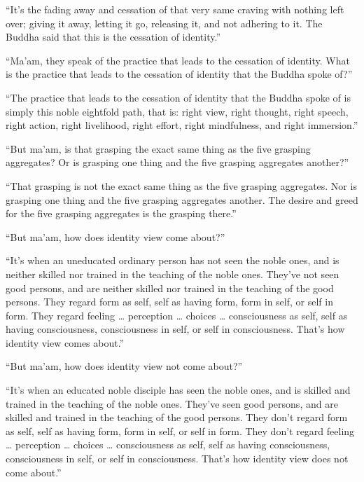 \documentclass[12pt,openany]{book}%
\begin{document}
“It’s the fading away and cessation of that very same craving with nothing left over; giving it away, letting it go, releasing it, and not adhering to it. The Buddha said that this is the cessation of identity.” 

“Ma’am, they speak of the practice that leads to the cessation of identity. What is the practice that leads to the cessation of identity that the Buddha spoke of?” 

“The practice that leads to the cessation of identity that the Buddha spoke of is simply this noble eightfold path, that is: right view, right thought, right speech, right action, right livelihood, right effort, right mindfulness, and right immersion.” 

“But ma’am, is that grasping the exact same thing as the five grasping aggregates? Or is grasping one thing and the five grasping aggregates another?” 

“That grasping is not the exact same thing as the five grasping aggregates. Nor is grasping one thing and the five grasping aggregates another. The desire and greed for the five grasping aggregates is the grasping there.” 

“But ma’am, how does identity view come about?” 

“It’s when an uneducated ordinary person has not seen the noble ones, and is neither skilled nor trained in the teaching of the noble ones. They’ve not seen good persons, and are neither skilled nor trained in the teaching of the good persons. They regard form as self, self as having form, form in self, or self in form. They regard feeling … perception … choices … consciousness as self, self as having consciousness, consciousness in self, or self in consciousness. That’s how identity view comes about.” 

“But ma’am, how does identity view not come about?” 

“It’s when an educated noble disciple has seen the noble ones, and is skilled and trained in the teaching of the noble ones. They’ve seen good persons, and are skilled and trained in the teaching of the good persons. They don’t regard form as self, self as having form, form in self, or self in form. They don’t regard feeling … perception … choices … consciousness as self, self as having consciousness, consciousness in self, or self in consciousness. That’s how identity view does not come about.” 
\end{document}
